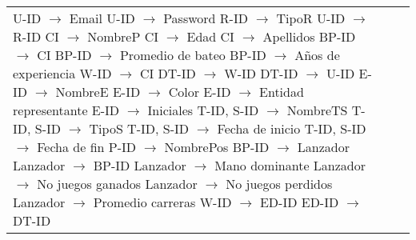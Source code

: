 \documentclass{report}
\begin{document}
\begin{tabularx}{\textwidth}{|X|X|X|}
        U-ID $\rightarrow$ Email \newline 
        U-ID $\rightarrow$ Password \newline 
        R-ID $\rightarrow$ TipoR \newline 
        U-ID $\rightarrow$ R-ID \newline 
        CI $\rightarrow$ NombreP \newline 
        CI $\rightarrow$ Edad \newline 
        CI $\rightarrow$ Apellidos \newline 
        BP-ID $\rightarrow$ CI \newline 
        BP-ID $\rightarrow$ Promedio de bateo \newline 
        BP-ID $\rightarrow$ Años de experiencia \newline 
        W-ID $\rightarrow$ CI \newline 
        DT-ID $\rightarrow$ W-ID \newline 
        DT-ID $\rightarrow$ U-ID \newline 
        E-ID $\rightarrow$ NombreE \newline 
        E-ID $\rightarrow$ Color \newline 
        E-ID $\rightarrow$ Entidad representante \newline 
        E-ID $\rightarrow$ Iniciales \newline 
        T-ID, S-ID $\rightarrow$ NombreTS \newline 
        T-ID, S-ID $\rightarrow$ TipoS \newline 
        T-ID, S-ID $\rightarrow$ Fecha de inicio \newline 
        T-ID, S-ID $\rightarrow$ Fecha de fin \newline 
        P-ID $\rightarrow$ NombrePos \newline 
        BP-ID $\rightarrow$ Lanzador \newline 
        Lanzador $\rightarrow$ BP-ID \newline 
        Lanzador $\rightarrow$ Mano dominante \newline 
        Lanzador $\rightarrow$ No juegos ganados \newline 
        Lanzador $\rightarrow$ No juegos perdidos \newline 
        Lanzador $\rightarrow$ Promedio carreras \newline 
        W-ID $\rightarrow$ ED-ID \newline 
        ED-ID $\rightarrow$ DT-ID \newline 

\end{tabularx}
\end{document}

